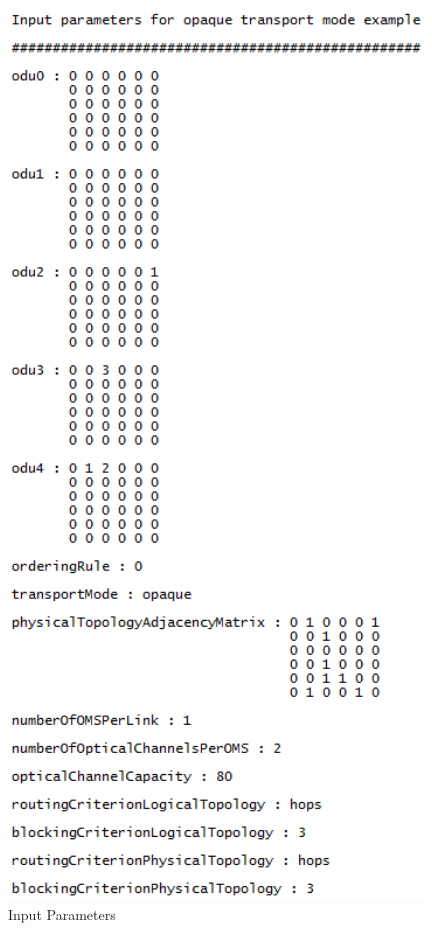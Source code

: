 \begin{figure}[H]
	\centering
	\includegraphics[width=11cm]{sdf/heuristic/opaque/figures/InputParameters}
	\caption{Input Parameters}
	\label{input_parameters}
\end{figure}

